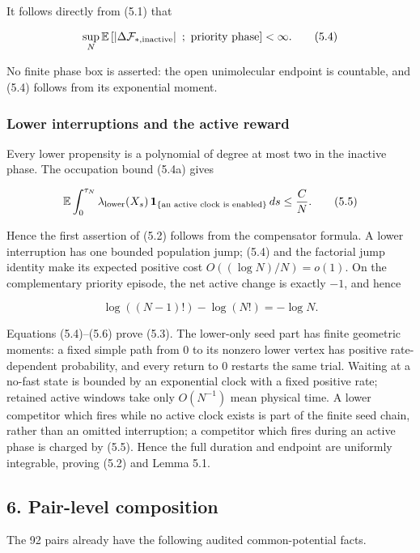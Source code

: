 It follows directly from (5.1) that

\[
 \sup_N {\mathbb E}\left[
  \left|\Delta{\cal F}_{*,\mathrm{inactive}}\right|
  \ ;\ \hbox{priority phase}\right]<\infty .            \tag{5.4}
\]

No finite phase box is asserted: the open unimolecular endpoint is
countable, and (5.4) follows from its exponential moment.

\subsubsection{Lower interruptions and the active
reward}

Every lower propensity is a polynomial of degree at most two in the
inactive phase. The occupation bound (5.4a) gives

\[
 {\mathbb E}\int_0^{\tau_N}
   \lambda_{\rm lower}(X_s)\,
   {\bf1}_{\{\text{an active clock is enabled}\}}\,ds
 \le {C\over N}.                                      \tag{5.5}
\]

Hence the first assertion of (5.2) follows from the compensator formula.
A lower interruption has one bounded population jump; (5.4) and the
factorial jump identity make its expected positive cost
\(O((\log N)/N)=o(1)\). On the complementary priority episode, the net
active change is exactly \(-1\), and hence

\[
 \log((N-1)!)-\log(N!)=-\log N.                        \tag{5.6}
\]

Equations (5.4)--(5.6) prove (5.3). The lower-only seed part has finite
geometric moments: a fixed simple path from \(0\) to its nonzero lower
vertex has positive rate-dependent probability, and every return to
\(0\) restarts the same trial. Waiting at a no-fast state is bounded by
an exponential clock with a fixed positive rate; retained active windows
take only \(O(N^{-1})\) mean physical time. A lower competitor which
fires while no active clock exists is part of the finite seed chain,
rather than an omitted interruption; a competitor which fires during an
active phase is charged by (5.5). Hence the full duration and endpoint
are uniformly integrable, proving (5.2) and Lemma 5.1.

\subsection{6. Pair-level composition}

The 92 pairs already have the following audited common-potential facts.

